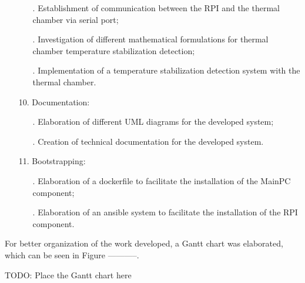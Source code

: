 \begin{itemize}
\begin{itemize}
            \item[.] Establishment of communication between the RPI and the thermal chamber via serial port;
            \item[.] Investigation of different mathematical formulations for thermal chamber temperature stabilization detection;
            \item[.] Implementation of a temperature stabilization detection system with the thermal chamber.
        \end{itemize}
    \item[] 10. Documentation:
        \begin{itemize}
            \item[.] Elaboration of different UML diagrams for the developed system;
            \item[.] Creation of technical documentation for the developed system.
        \end{itemize}
    \item[] 11. Bootstrapping:
        \begin{itemize}
            \item[.] Elaboration of a dockerfile to facilitate the installation of the MainPC component;
            \item[.] Elaboration of an ansible system to facilitate the installation of the RPI component.
        \end{itemize}
\end{itemize}

For better organization of the work developed, a Gantt chart was elaborated, which can be seen in Figure -----------.

TODO: Place the Gantt chart here